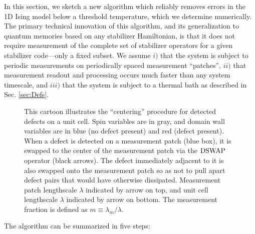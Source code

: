 \documentclass[twocolumn,superscriptaddress,aps,prb,floatfix]{revtex4-1}
\begin{document}
In this section, we sketch a new algorithm which reliably removes errors in the 1D Ising model below a threshold temperature, which we determine numerically.  The primary technical innovation of this algorithm, and its generalization to quantum memories based on any stabilizer Hamiltonian, is that it does not require measurement of the complete set of stabilizer operators for a given stabilizer code---only a fixed subset.  We assume $i)$ that the system is subject to periodic measurements on periodically spaced measurement ``patches'', $ii)$ that measurement readout and processing occurs much faster than any system timescale, and $iii)$ that the system is subject to a thermal bath as described in Sec. \ref{sec:Defs}.

\begin{figure}
\begin{center}
\end{center}
\caption{This cartoon illustrates the ``centering'' procedure for detected defects on a unit cell.  Spin variables are in gray, and domain wall variables are in blue (no defect present) and red (defect present).  When a defect is detected on a measurement patch (blue box), it is swapped to the center of the measurement patch via the $\rm{DSWAP}$ operator (black arrows).  The defect immediately adjacent to it is also swapped onto the measurement patch so as not to pull apart defect pairs that would have otherwise dissipated.  Measurement patch lengthscale $\lambda$ indicated by arrow on top, and unit cell lengthscale $\lambda$ indicated by arrow on bottom. The measurement fraction is defined as $m\equiv \lambda_m/\lambda$.}
\label{fig:detect_swap}
\end{figure}

The algorithm can be summarized in five steps:
\end{document}
